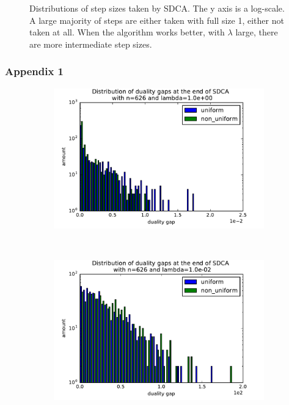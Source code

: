 \documentclass{beamer}
\DeclareMathOperator{\1}{\mathbb{1}}
\begin{document}
\begin{frame}
\begin{figure}
\begin{subfigure}[t]{0.3\textwidth}
    \end{subfigure}
    \caption{Distributions of step sizes taken by SDCA. The y axis is a log-scale. A large majority of steps are either taken with full size 1, either not taken at all. When the algorithm works better, with $\lambda$ large, there are more intermediate step sizes.}
	\label{ocr step sizes}
\end{figure}
\end{frame}
\begin{frame}
	\frametitle{Appendix 1}
	\begin{figure}
    \centering
    \begin{subfigure}[t]{0.3\textwidth}
        \centering
        \includegraphics[width=\textwidth]{images/20170914_040308_ocr_optdualgaps.pdf}
    \end{subfigure}
    ~
    \begin{subfigure}[t]{0.3\textwidth}
        \centering
        \includegraphics[width=\textwidth]{images/20170914_041703_ocr_optdualgaps.pdf}

\end{subfigure}
\end{figure}
\end{frame}
\end{document}

